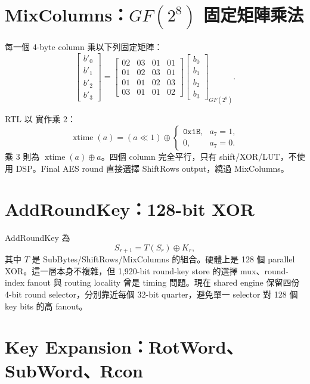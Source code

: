 \documentclass[UTF8,fontset=none,11pt,a4paper]{ctexrep}
\newcommand{\code}[1]{\texttt{\detokenize{#1}}}
\begin{document}
\section{MixColumns：$GF(2^8)$ 固定矩陣乘法}

每一個 4-byte column 乘以下列固定矩陣：
\begin{equation}
\begin{bmatrix}
b'_0\\b'_1\\b'_2\\b'_3
\end{bmatrix}
=
\begin{bmatrix}
02&03&01&01\\
01&02&03&01\\
01&01&02&03\\
03&01&01&02
\end{bmatrix}
\begin{bmatrix}
b_0\\b_1\\b_2\\b_3
\end{bmatrix}_{GF(2^8)}.
\end{equation}

RTL 以 \code{xtime} 實作乘 2：
\begin{equation}
\operatorname{xtime}(a)=(a\ll 1)\oplus
\begin{cases}
\texttt{0x1B}, & a_7=1,\\
0, & a_7=0.
\end{cases}
\end{equation}
乘 3 則為 $\operatorname{xtime}(a)\oplus a$。四個 column 完全平行，只有 shift/XOR/LUT，不使用 DSP。Final AES round 直接選擇 ShiftRows output，繞過 MixColumns。

\section{AddRoundKey：128-bit XOR}

AddRoundKey 為
\begin{equation}
  S_{r+1}=T(S_r)\oplus K_r,
\end{equation}
其中 $T$ 是 SubBytes/ShiftRows/MixColumns 的組合。硬體上是 128 個 parallel XOR。這一層本身不複雜，但 1,920-bit round-key store 的選擇 mux、round-index fanout 與 routing locality 曾是 timing 問題。現在 shared engine 保留四份 4-bit round selector，分別靠近每個 32-bit quarter，避免單一 selector 對 128 個 key bits 的高 fanout。

\section{Key Expansion：RotWord、SubWord、Rcon}
\end{document}
